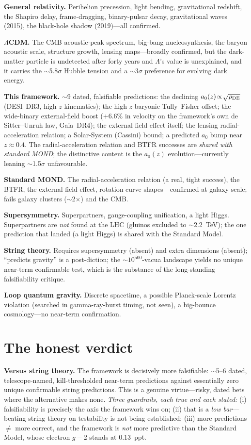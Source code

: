 \documentclass[aps,prd,twocolumn,10pt,nofootinbib]{revtex4-2}
\begin{document}
\textbf{General relativity.} Perihelion precession, light bending, gravitational redshift, the Shapiro delay,
frame-dragging, binary-pulsar decay, gravitational waves (2015), the black-hole shadow (2019)---all confirmed.

\textbf{$\Lambda$CDM.} The CMB acoustic-peak spectrum, big-bang nucleosynthesis, the baryon acoustic scale,
structure growth, lensing maps---broadly confirmed, but the dark-matter particle is undetected after forty years
and $\Lambda$'s value is unexplained, and it carries the $\sim$5.8$\sigma$ Hubble tension and a $\sim$3$\sigma$
preference for evolving dark energy.

\textbf{This framework.} $\sim$9 dated, falsifiable predictions: the declining $a_0(z)\!\propto\!\sqrt{\rho_{\rm
DE}}$ (DESI~DR3, high-$z$ kinematics); the high-$z$ baryonic Tully--Fisher offset; the wide-binary external-field
boost ($+6.6\%$ in velocity on the framework's own de Sitter--Unruh law, Gaia~DR4); the external field effect
itself; the lensing radial-acceleration relation; a Solar-System (Cassini) bound; a predicted $a_0$ bump near
$z\!\approx\!0.4$. The radial-acceleration relation and BTFR successes are \emph{shared with standard MOND}; the
distinctive content is the $a_0(z)$ evolution---currently leaning $\sim$1.5$\sigma$ unfavourable.

\textbf{Standard MOND.} The radial-acceleration relation (a real, tight success), the BTFR, the external field
effect, rotation-curve shapes---confirmed at galaxy scale; fails galaxy clusters ($\sim$2$\times$) and the CMB.

\textbf{Supersymmetry.} Superpartners, gauge-coupling unification, a light Higgs. Superpartners are \emph{not}
found at the LHC (gluinos excluded to $\sim$2.2~TeV); the one prediction that landed (a light Higgs) is shared with
the Standard Model.

\textbf{String theory.} Requires supersymmetry (absent) and extra dimensions (absent); ``predicts gravity'' is a
post-diction; the $\sim$$10^{500}$-vacua landscape yields no unique near-term confirmable test, which is the
substance of the long-standing falsifiability critique.

\textbf{Loop quantum gravity.} Discrete spacetime, a possible Planck-scale Lorentz violation (searched in
gamma-ray-burst timing, not seen), a big-bounce cosmology---no near-term confirmation.

\section{The honest verdict}
\textbf{Versus string theory.} The framework is decisively more falsifiable: $\sim$5--6 dated, telescope-named,
kill-thresholded near-term predictions against essentially zero unique confirmable string predictions. This is a
genuine virtue---risky, dated bets where the alternative makes none. \emph{Three guardrails, each true and each
stated:} (i) falsifiability is precisely the axis the framework wins on; (ii) that is a \emph{low bar}---beating
string theory on testability is not being established; (iii) more predictions $\neq$ more correct, and the framework
is \emph{not} more predictive than the Standard Model, whose electron $g\!-\!2$ stands at 0.13~ppt.
\end{document}

